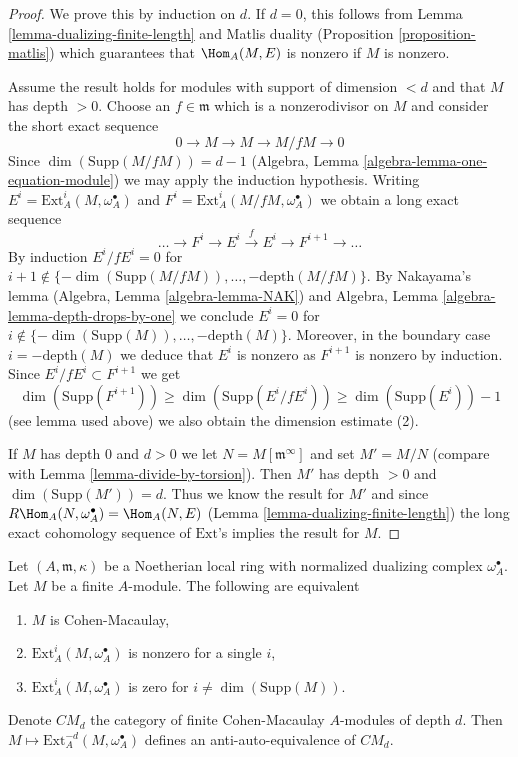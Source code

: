 \begin{proof}
We prove this by induction on $d$. If $d = 0$, this follows from
Lemma \ref{lemma-dualizing-finite-length} and Matlis duality
(Proposition \ref{proposition-matlis}) which guarantees that
$\Hom_A(M, E)$ is nonzero if $M$ is nonzero.

\medskip\noindent
Assume the result holds for modules with support of dimension $< d$ and that
$M$ has depth $> 0$. Choose an $f \in \mathfrak m$ which is a nonzerodivisor
on $M$ and consider the short exact sequence
$$
0 \to M \to M \to M/fM \to 0
$$
Since $\dim(\text{Supp}(M/fM)) = d - 1$
(Algebra, Lemma \ref{algebra-lemma-one-equation-module}) we
may apply the induction hypothesis.
Writing
$E^i = \text{Ext}^i_A(M, \omega_A^\bullet)$ and
$F^i = \text{Ext}^i_A(M/fM, \omega_A^\bullet)$
we obtain a long exact sequence
$$
\ldots \to F^i \to E^i \xrightarrow{f} E^i \to F^{i + 1} \to \ldots
$$
By induction $E^i/fE^i = 0$ for
$i + 1 \not \in \{-\dim(\text{Supp}(M/fM)), \ldots, -\text{depth}(M/fM)\}$.
By Nakayama's lemma (Algebra, Lemma \ref{algebra-lemma-NAK})
and Algebra, Lemma \ref{algebra-lemma-depth-drops-by-one}
we conclude $E^i = 0$ for
$i \not \in \{-\dim(\text{Supp}(M)), \ldots, -\text{depth}(M)\}$.
Moreover, in the boundary case $i = - \text{depth}(M)$ we deduce that $E^i$
is nonzero as $F^{i + 1}$ is nonzero by induction.
Since $E^i/fE^i \subset F^{i + 1}$ we get
$$
\dim(\text{Supp}(F^{i + 1})) \geq \dim(\text{Supp}(E^i/fE^i))
\geq \dim(\text{Supp}(E^i)) - 1
$$
(see lemma used above) we also obtain the dimension estimate (2).

\medskip\noindent
If $M$ has depth $0$ and $d > 0$ we let $N = M[\mathfrak m^\infty]$ and set
$M' = M/N$ (compare with Lemma \ref{lemma-divide-by-torsion}).
Then $M'$ has depth $>0$ and $\dim(\text{Supp}(M')) = d$.
Thus we know the result for $M'$ and since
$R\Hom_A(N, \omega_A^\bullet) = \Hom_A(N, E)$
(Lemma \ref{lemma-dualizing-finite-length})
the long exact cohomology sequence of $\text{Ext}$'s implies the
result for $M$.
\end{proof}

\begin{lemma}
\label{lemma-local-CM}
Let $(A, \mathfrak m, \kappa)$ be a Noetherian local ring
with normalized dualizing complex $\omega_A^\bullet$. Let $M$
be a finite $A$-module. The following are equivalent
\begin{enumerate}
\item $M$ is Cohen-Macaulay,
\item $\text{Ext}^i_A(M, \omega_A^\bullet)$ is nonzero for a single $i$,
\item $\text{Ext}^i_A(M, \omega_A^\bullet)$ is zero for
$i \not = \dim(\text{Supp}(M))$.
\end{enumerate}
Denote $CM_d$ the category of finite Cohen-Macaulay $A$-modules
of depth $d$. Then $M \mapsto \text{Ext}^{-d}_A(M, \omega_A^\bullet)$
defines an anti-auto-equivalence of $CM_d$.
\end{lemma}

